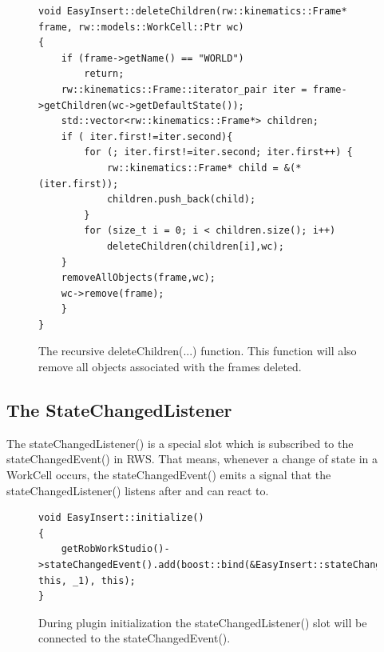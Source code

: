 \begin{figure}[h] %
\centering
\lstset{language=C++} 
\begin{lstlisting}[frame=single]  
void EasyInsert::deleteChildren(rw::kinematics::Frame* frame, rw::models::WorkCell::Ptr wc)
{
    if (frame->getName() == "WORLD")
    	return;
    rw::kinematics::Frame::iterator_pair iter = frame->getChildren(wc->getDefaultState());
    std::vector<rw::kinematics::Frame*> children;
    if ( iter.first!=iter.second){
        for (; iter.first!=iter.second; iter.first++) {
            rw::kinematics::Frame* child = &(*(iter.first));
            children.push_back(child);
        }
        for (size_t i = 0; i < children.size(); i++) 
            deleteChildren(children[i],wc);    
    }
    removeAllObjects(frame,wc);
    wc->remove(frame);
    }
}
\end{lstlisting}
\caption{The recursive deleteChildren(...) function. This function will also remove all objects associated with the frames deleted.}
\label{fig:eiDeleteChildren} 	
\end{figure}



\subsection{The StateChangedListener}
\label{sec:eiStateChangedListener}

The stateChangedListener() is a special slot which is subscribed to the stateChangedEvent() in RWS. That means, whenever a change of state in a WorkCell occurs, the stateChangedEvent() emits a signal that the stateChangedListener() listens after and can react to. 

\begin{figure}[h] %
\centering
\lstset{language=C++} 
\begin{lstlisting}[frame=single] 
void EasyInsert::initialize()
{
    getRobWorkStudio()->stateChangedEvent().add(boost::bind(&EasyInsert::stateChangedListener, this, _1), this);
}
\end{lstlisting}
\caption{During plugin initialization the stateChangedListener() slot will be connected to the stateChangedEvent().}
\label{fig:eiStateChangedListener} 	
\end{figure}

